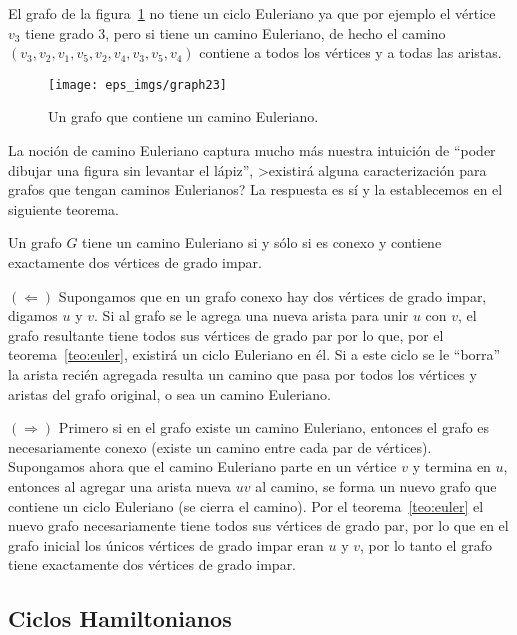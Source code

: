 \begin{ejemplo}
El grafo de la figura~\ref{fig:graph23} no tiene un ciclo Euleriano ya que por ejemplo el vértice $v_3$ tiene grado 3, pero si tiene un camino Euleriano, de hecho el camino $(v_3,v_2,v_1,v_5,v_2,v_4,v_3,v_5,v_4)$ contiene a todos los vértices y a todas las aristas.
\begin{figure}[h!]
\centering
\texttt{[image: eps\_imgs/graph23]}
\caption{Un grafo que contiene un camino Euleriano.}
\label{fig:graph23}
\end{figure}
\end{ejemplo}

La noción de camino Euleriano captura mucho más nuestra intuición de ``poder dibujar una figura sin levantar el lápiz'', >existirá alguna caracterización para grafos que tengan caminos Eulerianos?
La respuesta es sí y la establecemos en el siguiente teorema.

\begin{teorema}
Un grafo $G$ tiene un camino Euleriano si y sólo si es conexo y contiene exactamente dos vértices de grado impar.

\begin{demostracion}
$(\Leftarrow)$ Supongamos que en un grafo conexo hay dos vértices de grado impar, digamos $u$ y $v$.
Si al grafo se le agrega una nueva arista para unir $u$ con $v$, el grafo resultante tiene todos sus vértices de grado par por lo que, por el teorema~\ref{teo:euler}, existirá un ciclo Euleriano en él.
Si a este ciclo se le ``borra'' la arista recién agregada resulta un camino que pasa por todos los vértices y aristas del grafo original, o sea un camino Euleriano.

$(\Rightarrow)$ 
Primero si en el grafo existe un camino Euleriano, entonces el grafo es necesariamente conexo (existe un camino entre cada par de vértices).
Supongamos ahora que el camino Euleriano parte en un vértice $v$ y termina en $u$, entonces al agregar una arista nueva $uv$ al camino, se forma un nuevo grafo que contiene un ciclo Euleriano (se cierra el camino).
Por el teorema~\ref{teo:euler} el nuevo grafo necesariamente tiene todos sus vértices de grado par, por lo que en el grafo inicial los únicos vértices de grado impar eran $u$ y $v$, por lo tanto el grafo tiene exactamente dos vértices de grado impar.
\end{demostracion}
\end{teorema}

\subsection{Ciclos Hamiltonianos}

